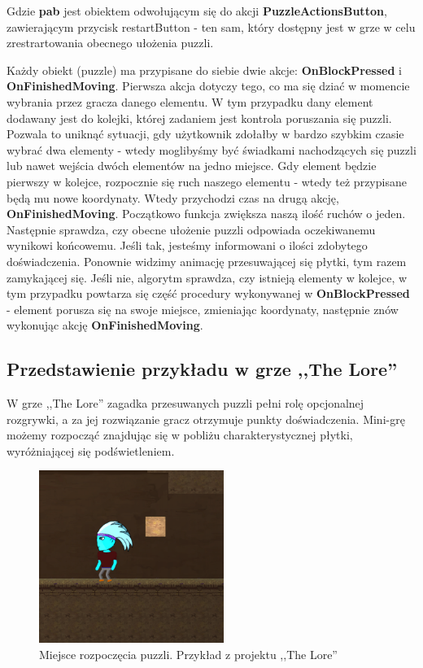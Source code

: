 \documentclass[oneside,polski,logo]{amuthesis}
\begin{document}
Gdzie \textbf{pab} jest obiektem odwołującym się do akcji \textbf{PuzzleActionsButton}, zawierającym przycisk restartButton - ten sam, który dostępny jest w grze w celu zrestrartowania obecnego ułożenia puzzli.

Każdy obiekt (puzzle) ma przypisane do siebie dwie akcje: \textbf{OnBlockPressed} i \textbf{OnFinishedMoving}. Pierwsza akcja dotyczy tego, co ma się dziać w momencie wybrania przez gracza danego elementu. W tym przypadku dany element dodawany jest do kolejki, której zadaniem jest kontrola poruszania się puzzli. Pozwala to uniknąć sytuacji, gdy użytkownik zdołałby w bardzo szybkim czasie wybrać dwa elementy - wtedy moglibyśmy być świadkami nachodzących się puzzli lub nawet wejścia dwóch elementów na jedno miejsce. Gdy element będzie pierwszy w kolejce, rozpocznie się ruch naszego elementu - wtedy też przypisane będą mu nowe koordynaty. Wtedy przychodzi czas na drugą akcję, \textbf{OnFinishedMoving}. Początkowo funkcja zwiększa naszą ilość ruchów o jeden. Następnie sprawdza, czy obecne ułożenie puzzli odpowiada oczekiwanemu wynikowi końcowemu. Jeśli tak, jesteśmy informowani o ilości zdobytego doświadczenia. Ponownie widzimy animację przesuwającej się płytki, tym razem zamykającej się. Jeśli nie, algorytm sprawdza, czy istnieją elementy w kolejce, w tym przypadku powtarza się część procedury wykonywanej w \textbf{OnBlockPressed} - element porusza się na swoje miejsce, zmieniając koordynaty, następnie znów wykonując akcję \textbf{OnFinishedMoving}.

\subsection{Przedstawienie przykładu w grze ,,The Lore''}
\par W grze ,,The Lore'' zagadka przesuwanych puzzli pełni rolę opcjonalnej rozgrywki, a za jej rozwiązanie gracz otrzymuje punkty doświadczenia. Mini-grę możemy rozpocząć znajdując się w pobliżu charakterystycznej płytki, wyróżniającej się podświetleniem.
\begin{figure}[h]
	\centering
	\includegraphics[width=6cm]{images/tyrek/the_lore_puzzle_lvl1.png}
	\caption{Miejsce rozpoczęcia puzzli. Przykład z projektu ,,The Lore''}
\end{figure}
\end{document}
